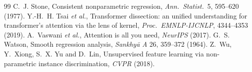 \documentclass[11pt]{article}
\begin{document}
\begin{thebibliography}{99}
 C.~J. Stone, Consistent nonparametric regression, \emph{Ann.\ Statist.}\ 5, 595--620 (1977).
 Y.-H.~H. Tsai \emph{et al.}, Transformer dissection: an unified understanding for transformer's attention via the lens of kernel, \emph{Proc.\ EMNLP-IJCNLP}, 4344--4353 (2019).
 A.~Vaswani \emph{et al.}, Attention is all you need, \emph{NeurIPS} (2017).
 G.~S. Watson, Smooth regression analysis, \emph{Sankhy\=a A} 26, 359--372 (1964).
 Z.~Wu, Y.~Xiong, S.~X. Yu and D.~Lin, Unsupervised feature learning via non-parametric instance discrimination, \emph{CVPR} (2018).
\end{thebibliography}

\SourceNote
\end{document}
